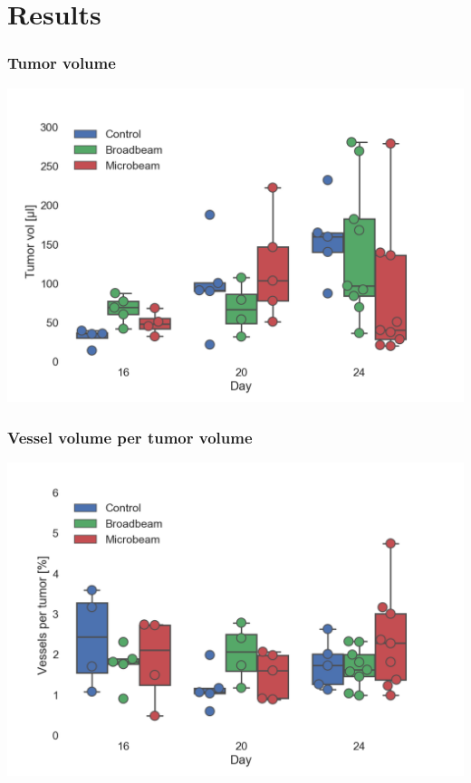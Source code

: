 \documentclass[draft]{beamer}
\newcommand{\imsize}{\linewidth} %
\begin{document}
\section{Results}
\renewcommand{\imsize}{0.9\linewidth}
\begin{frame}
	\frametitle{Tumor volume}
	\includegraphics[width=\imsize]{img/talk_tumor_volume_day}	
\end{frame}

\begin{frame}
	\frametitle{Vessel volume per tumor volume}
	\includegraphics[width=\imsize]{img/talk_vessel_ratio_day}	
\end{frame}
\end{document}
